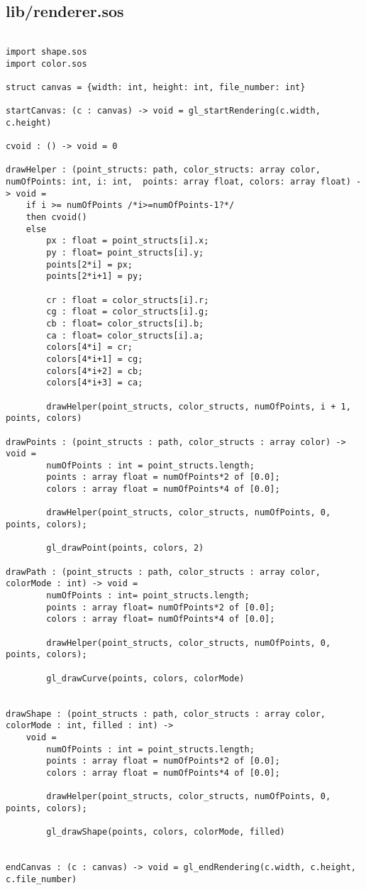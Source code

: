 \documentclass[main.tex]{subfiles}
\begin{document}
\subsection{lib/renderer.sos}

\begin{lstlisting}

import shape.sos
import color.sos

struct canvas = {width: int, height: int, file_number: int}

startCanvas: (c : canvas) -> void = gl_startRendering(c.width, c.height)

cvoid : () -> void = 0

drawHelper : (point_structs: path, color_structs: array color, numOfPoints: int, i: int,  points: array float, colors: array float) -> void =
    if i >= numOfPoints /*i>=numOfPoints-1?*/
    then cvoid()
    else
        px : float = point_structs[i].x;
        py : float= point_structs[i].y;
        points[2*i] = px;
        points[2*i+1] = py;

        cr : float = color_structs[i].r;
        cg : float = color_structs[i].g;
        cb : float= color_structs[i].b;
        ca : float= color_structs[i].a;
        colors[4*i] = cr;
        colors[4*i+1] = cg;
        colors[4*i+2] = cb;
        colors[4*i+3] = ca;

        drawHelper(point_structs, color_structs, numOfPoints, i + 1, points, colors)

drawPoints : (point_structs : path, color_structs : array color) -> void = 
        numOfPoints : int = point_structs.length;
        points : array float = numOfPoints*2 of [0.0];
        colors : array float = numOfPoints*4 of [0.0];
        
        drawHelper(point_structs, color_structs, numOfPoints, 0,  points, colors);

        gl_drawPoint(points, colors, 2)

drawPath : (point_structs : path, color_structs : array color,  colorMode : int) -> void = 
        numOfPoints : int= point_structs.length;
        points : array float= numOfPoints*2 of [0.0];
        colors : array float= numOfPoints*4 of [0.0];

        drawHelper(point_structs, color_structs, numOfPoints, 0,  points, colors);
        
        gl_drawCurve(points, colors, colorMode)


drawShape : (point_structs : path, color_structs : array color,  colorMode : int, filled : int) ->
    void = 
        numOfPoints : int = point_structs.length;
        points : array float = numOfPoints*2 of [0.0];
        colors : array float = numOfPoints*4 of [0.0];

        drawHelper(point_structs, color_structs, numOfPoints, 0,  points, colors);

        gl_drawShape(points, colors, colorMode, filled)


endCanvas : (c : canvas) -> void = gl_endRendering(c.width, c.height, c.file_number)
\end{lstlisting}
\end{document}
